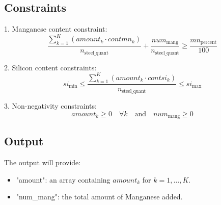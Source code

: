 \documentclass{article}
\begin{document}
\subsection*{Constraints}

1. Manganese content constraint:
\[
\frac{\sum_{k=1}^{K} (amount_k \cdot contmn_k)}{n_{\text{steel\_quant}}} + \frac{num_{\text{mang}}}{n_{\text{steel\_quant}}} \geq \frac{mn_{\text{percent}}}{100}
\]

2. Silicon content constraints:
\[
si_{\text{min}} \leq \frac{\sum_{k=1}^{K} (amount_k \cdot contsi_k)}{n_{\text{steel\_quant}}} \leq si_{\text{max}}
\]

3. Non-negativity constraints:
\[
amount_k \geq 0 \quad \forall k \quad \text{and} \quad num_{\text{mang}} \geq 0
\]

\subsection*{Output}

The output will provide:
\begin{itemize}
    \item "amount": an array containing $amount_k$ for $k = 1, \ldots, K$.
    \item "num\_mang": the total amount of Manganese added.
\end{itemize}
\end{document}
